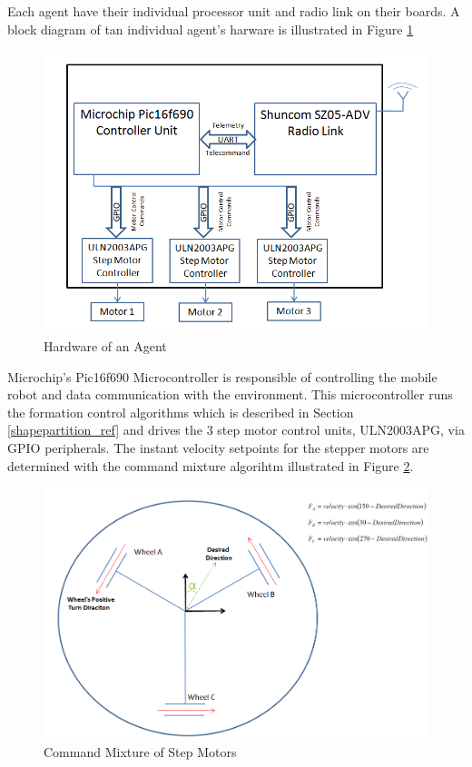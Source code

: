 Each agent have their individual processor unit and radio link on their boards. A block diagram of tan individual agent's harware is illustrated in Figure \ref{indhardware_ref}
		
\begin{figure}[H]
\caption{Hardware of an Agent} \label{indhardware_ref}
\centerline{\includegraphics[scale = 0.70]{agent}}
\end{figure} 
		
Microchip's Pic16f690 Microcontroller is responsible of controlling the mobile robot and data communication with the environment. This microcontroller runs the formation control algorithms which is described in Section \ref{shapepartition_ref} and drives the 3 step motor control units, ULN2003APG, via GPIO peripherals. The instant velocity setpoints for the stepper motors  are determined with the command mixture algorihtm illustrated in Figure \ref{ccmb_ref}.
		
\begin{figure}[H]
\caption{Command Mixture of Step Motors} \label{ccmb_ref}
\centerline{\includegraphics[scale = 0.60]{ccmb}}
\end{figure} 

